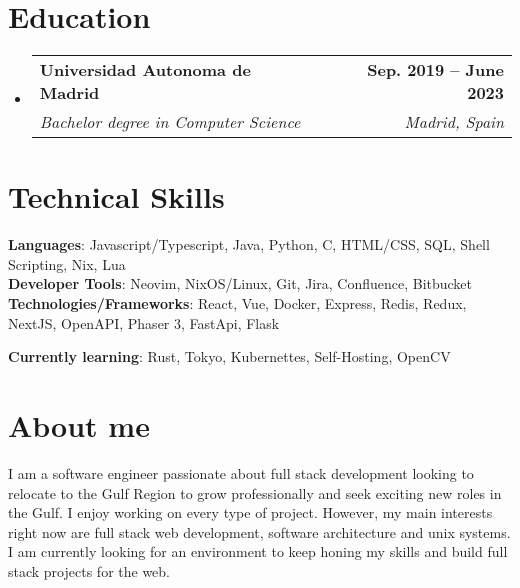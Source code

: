 \documentclass[letterpaper,11pt]{article}
\makeatletter
\newcommand{\resumeSubheading}[4]{
  \vspace{-2pt}\item
    \begin{tabular*}{1.0\textwidth}[t]{l@{\extracolsep{\fill}}r}
      \textbf{#1} & \textbf{\small #2} \\
      \textit{\small#3} & \textit{\small #4} \\
    \end{tabular*}\vspace{-7pt}
}
\newcommand{\resumeSubHeadingListStart}{\begin{itemize}[leftmargin=0.0in, label={}]}
\newcommand{\resumeSubHeadingListEnd}{\end{itemize}}
\makeatother
\begin{document}
\section{\Large Education}
  \resumeSubHeadingListStart
    \resumeSubheading
      {Universidad Autonoma de Madrid}{Sep. 2019 -- June 2023}
      {Bachelor degree in Computer Science}{Madrid, Spain}
  \resumeSubHeadingListEnd\vspace{-4pt}

\section{\Large Technical Skills}
 \begin{itemize}[leftmargin=0.15in, label={}]
    \small{\item{
     \textbf{Languages}{: Javascript/Typescript, Java, Python, C, HTML/CSS, SQL, Shell Scripting, Nix, Lua} \\
     \textbf{Developer Tools}{: Neovim, NixOS/Linux, Git, Jira, Confluence, Bitbucket} \\
     \textbf{Technologies/Frameworks}{: React, Vue, Docker, Express, Redis, Redux, NextJS, OpenAPI, Phaser 3, FastApi, Flask} \\
    }}
     \textbf{Currently learning}{: Rust, Tokyo, Kubernettes, Self-Hosting, OpenCV} \\
 \end{itemize}
 \vspace{-10pt}


 \section{\Large About me}
  I am a software engineer passionate about full stack development looking to relocate to the Gulf Region to grow professionally and seek exciting new roles in the Gulf. I enjoy working on every type of project. However, my main interests right now are full stack web development, software architecture and unix systems. I am currently looking for an environment to keep honing my skills and build full stack projects for the web.
\end{document}
